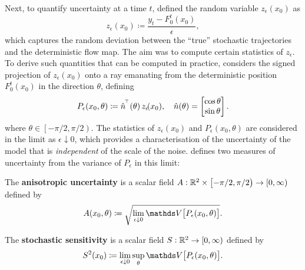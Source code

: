 Next, to quantify uncertainty at a time \(t\), \citet{Balasuriya_2020_StochasticSensitivityComputable} defined the random variable \(z_\epsilon\left(x_0\right)\) as
\[
	z_\epsilon\!\left(x_0\right) \coloneqq \frac{y_t - F_0^t\!\left(x_0\right)}{\epsilon},
\]
which captures the random deviation between the ``true'' stochastic trajectories and the deterministic flow map.
The aim was to compute certain statistics of \(z_\epsilon\).
To derive such quantities that can be computed in practice, \citet{Balasuriya_2020_StochasticSensitivityComputable} considers the signed projection of \(z_\epsilon\!\left(x_0\right)\) onto a ray emanating from the deterministic position \(F_0^t\!\left(x_0\right)\) in the direction \(\theta\), defining
\[
	P_\epsilon\!\left(x_0,\theta\right) \coloneqq \hat{n}^{^{\!\top}}\!\left(\theta\right) z_\epsilon\!(x_0), \quad \hat{n}\!\left(\theta\right) = \begin{bmatrix}
		\cos{\theta} \\
		\sin{\theta}
	\end{bmatrix}.
\]
where \(\theta \in \left[-\pi/2, \pi/2\right)\).
The statistics of \(z_\epsilon\!\left(x_0\right)\) and \(P_\epsilon\!\left(x_0,\theta\right)\) are considered in the limit as \(\epsilon\downarrow 0\), which provides a characterisation of the uncertainty of the model that is \emph{independent} of the scale of the noise.
\citet{Balasuriya_2020_StochasticSensitivityComputable} defines two measures of uncertainty from the variance of \(P_\epsilon\) in this limit:  %

\begin{definition}
	\begin{alpharate}
		\item The \textbf{anisotropic uncertainty} is a scalar field \(A: \mathbb{R}^2\times\left[-\pi/2, \pi/2\right) \to [0,\infty)\) defined by
		\[
			A\!\left(x_0,\theta\right) \coloneqq \sqrt{\lim_{\epsilon\downarrow 0}\var{P_\epsilon\!\left(x_0,\theta\right)}}.
		\]

		\item The \textbf{stochastic sensitivity} is a scalar field \(S: \mathbb{R}^2 \to [0,\infty)\) defined by
		\[
			S^2\!\left(x_0\right) \coloneqq \lim_{\epsilon\downarrow 0}\sup_{\theta}{\var{P_\epsilon\!\left(x_0,\theta\right)}}.
		\]
	\end{alpharate}
\end{definition}

